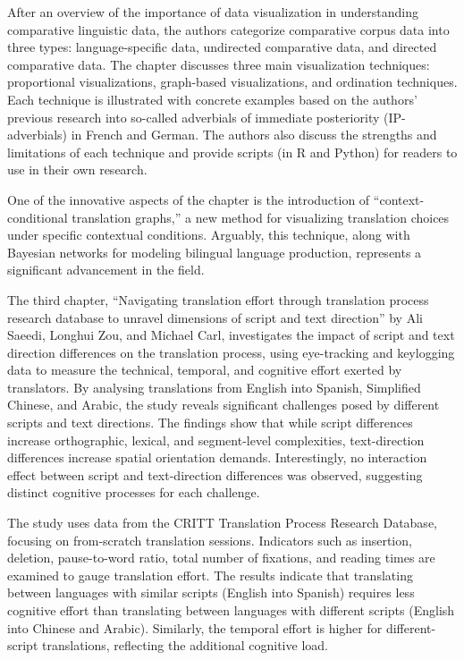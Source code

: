 \documentclass[output=paper]{langscibook}
\begin{document}
After an overview of the importance of data visualization in understanding comparative linguistic data, the authors categorize comparative corpus data into three types: language-specific data, undirected comparative data, and directed comparative data. The chapter discusses three main visualization techniques: proportional visualizations, graph-based visualizations, and ordination techniques. Each technique is illustrated with concrete examples based on the authors’ previous research into so-called adverbials of immediate posteriority (IP-adverbials) in French and German. The authors also discuss the strengths and limitations of each technique and provide scripts (in R and Python) for readers to use in their own research.

One of the innovative aspects of the chapter is the introduction of “context-conditional translation graphs,” a new method for visualizing translation choices under specific contextual conditions. Arguably, this technique, along with Bayesian networks for modeling bilingual language production, represents a significant advancement in the field.

The third chapter, “Navigating translation effort through translation process research database to unravel dimensions of script and text direction” by Ali Saeedi, Longhui Zou, and Michael Carl, investigates the impact of script and text direction differences on the translation process, using eye-tracking and keylogging data to measure the technical, temporal, and cognitive effort exerted by translators. By analysing translations from English into Spanish, Simplified Chinese, and Arabic, the study reveals significant challenges posed by different scripts and text directions. The findings show that while script differences increase orthographic, lexical, and segment-level complexities, text-direction differences increase spatial orientation demands. Interestingly, no interaction effect between script and text-direction differences was observed, suggesting distinct cognitive processes for each challenge.

The study uses data from the CRITT Translation Process Research Database, focusing on from-scratch translation sessions. Indicators such as insertion, deletion, pause-to-word ratio, total number of fixations, and reading times are examined to gauge translation effort. The results indicate that translating between languages with similar scripts (English into Spanish) requires less cognitive effort than translating between languages with different scripts (English into Chinese and Arabic). Similarly, the temporal effort is higher for different-script translations, reflecting the additional cognitive load.
\end{document}
